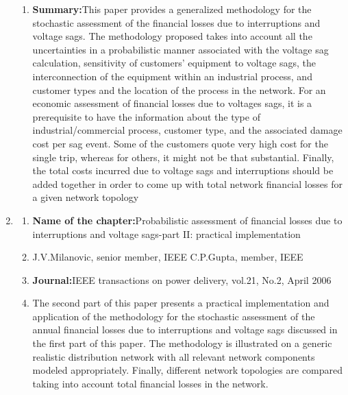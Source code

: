 \documentclass[14pt, a4paper]{extreport}
\begin{document}
\begin{enumerate}
\begin{enumerate}
    \item{\textbf{Summary:}}This paper provides a
generalized methodology
for the stochastic
assessment of the financial
losses due to interruptions
and voltage sags. The
methodology proposed
takes into account all the
uncertainties in a
probabilistic manner
associated with the
voltage sag calculation,
sensitivity of customers’
equipment to voltage
sags, the interconnection
of the equipment within
an industrial process, and
customer types and the
location of the process in
the network. For an
economic assessment of
financial losses due to
voltages sags, it is a
prerequisite to have the
information about the
type of
industrial/commercial
process, customer type,
and the associated
damage cost per sag event. Some of the
customers quote very high
cost for the single trip,
whereas for others, it
might not be that
substantial. Finally, the
total costs incurred due to
voltage sags and
interruptions
should be added together
in order to come up with
total network financial
losses for a given network topology
    \end{enumerate}
    \item
    \begin{enumerate}
    \item{\textbf{Name of the chapter:}}Probabilistic
assessment of
financial losses
due to
interruptions
and voltage
sags-part II:
practical
implementation
\item{}J.V.Milanovic,
senior member,
IEEE
C.P.Gupta,
member, IEEE
\item{\textbf{Journal:}}IEEE
transactions
on power
delivery,
vol.21, No.2,
April 2006
\item{}The second part of this
paper presents a practical
implementation and
application of the
methodology for the
stochastic assessment of
the annual financial losses
due to interruptions and
voltage sags discussed in
the first part of this
paper. The methodology
is illustrated on a generic
realistic distribution
network with all relevant
network components
modeled appropriately.
Finally, different network
topologies are compared
taking into account total
financial losses in the network.
\end{enumerate}


\end{enumerate}
\end{document}
